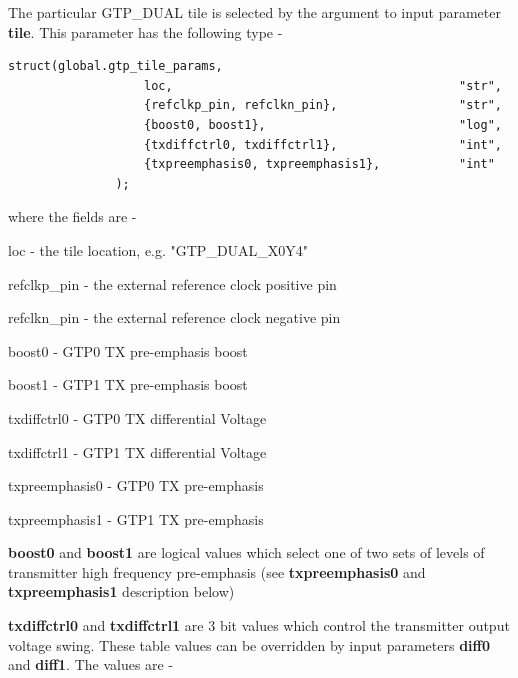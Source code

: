             The particular GTP\_DUAL tile is selected by the argument to input
            parameter {\bf tile}. This parameter has the following type -
            
            \begin{lstlisting}[gobble=12, language=threepl]
               struct(global.gtp_tile_params,
                   loc,                                        "str",
                   {refclkp_pin, refclkn_pin},                 "str",
                   {boost0, boost1},                           "log",
                   {txdiffctrl0, txdiffctrl1},                 "int",
                   {txpreemphasis0, txpreemphasis1},           "int"
               );
            \end{lstlisting}

            where the fields are -
            \blist
            \item   loc - the tile location, e.g. "GTP\_DUAL\_X0Y4"
            \item   refclkp\_pin - the external reference clock positive pin
            \item   refclkn\_pin - the external reference clock negative pin
            \item   boost0 - GTP0 TX pre-emphasis boost
            \item   boost1 - GTP1 TX pre-emphasis boost
            \item   txdiffctrl0 - GTP0 TX differential Voltage
            \item   txdiffctrl1 - GTP1 TX differential Voltage
            \item   txpreemphasis0 - GTP0 TX pre-emphasis
            \item   txpreemphasis1 - GTP1 TX pre-emphasis
            \blend
            
            {\bf boost0} and {\bf boost1} are logical values which select one of
            two sets of levels of transmitter high frequency pre-emphasis (see
            {\bf txpreemphasis0} and {\bf txpreemphasis1} description below)

            {\bf txdiffctrl0} and {\bf txdiffctrl1} are 3 bit values which
            control the transmitter output voltage swing. These table values can
            be overridden by input parameters {\bf diff0} and {\bf diff1}. The
            values are -
            
